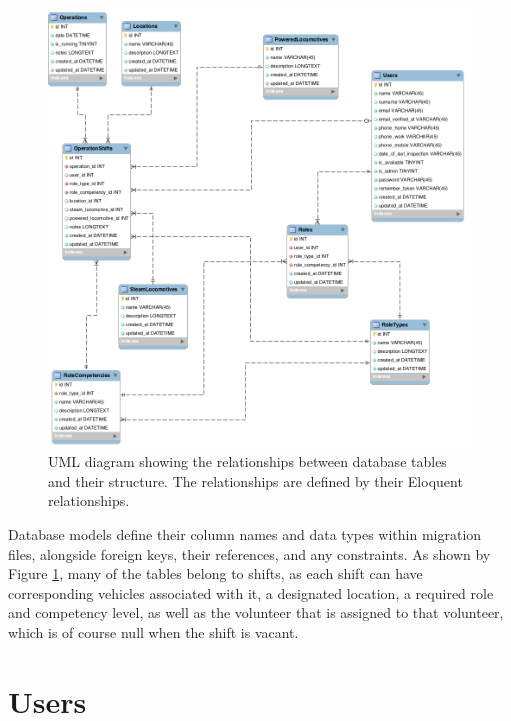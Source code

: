 \begin{figure}[!ht]
    \includegraphics[width=1.0\textwidth]{Figures/Models}
    \caption{UML diagram showing the relationships between database tables and their structure. The relationships are defined by their Eloquent relationships.}
    \label{fig:relationships}
\end{figure}

Database models define their column names and data types within migration files, alongside foreign keys, their references, and any constraints. As shown by Figure \ref{fig:relationships}, many of the tables belong to shifts, as each shift can have corresponding vehicles associated with it, a designated location, a required role and competency level, as well as the volunteer that is assigned to that volunteer, which is of course null when the shift is vacant.

\section{Users}

